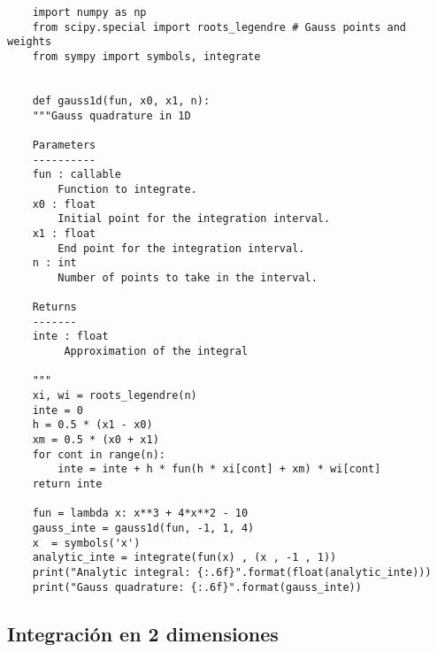 \begin{verbatim} 
    import numpy as np
    from scipy.special import roots_legendre # Gauss points and weights
    from sympy import symbols, integrate
    
    
    def gauss1d(fun, x0, x1, n):
    """Gauss quadrature in 1D
    
    Parameters
    ----------
    fun : callable
        Function to integrate.
    x0 : float
        Initial point for the integration interval.
    x1 : float
        End point for the integration interval.
    n : int
        Number of points to take in the interval.
    
    Returns
    -------
    inte : float
         Approximation of the integral
    
    """
    xi, wi = roots_legendre(n)
    inte = 0
    h = 0.5 * (x1 - x0)
    xm = 0.5 * (x0 + x1)
    for cont in range(n):
        inte = inte + h * fun(h * xi[cont] + xm) * wi[cont]
    return inte

    fun = lambda x: x**3 + 4*x**2 - 10
    gauss_inte = gauss1d(fun, -1, 1, 4)
    x  = symbols('x')
    analytic_inte = integrate(fun(x) , (x , -1 , 1))
    print("Analytic integral: {:.6f}".format(float(analytic_inte)))
    print("Gauss quadrature: {:.6f}".format(gauss_inte))
\end{verbatim}


\subsection{Integración en 2 dimensiones}

